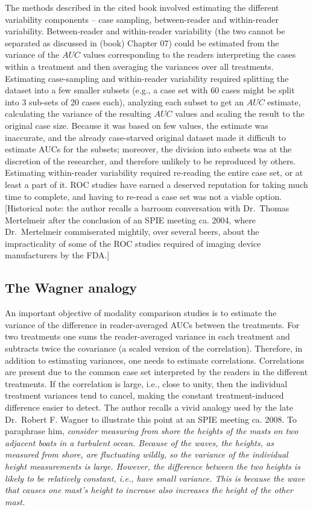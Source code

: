 \documentclass[
]{book}
\begin{document}
The methods \citep{RN412} described in the cited book involved estimating the different variability components -- case sampling, between-reader and within-reader variability. Between-reader and within-reader variability (the two cannot be separated as discussed in (book) Chapter 07) could be estimated from the variance of the \(AUC\) values corresponding to the readers interpreting the cases within a treatment and then averaging the variances over all treatments. Estimating case-sampling and within-reader variability required splitting the dataset into a few smaller subsets (e.g., a case set with 60 cases might be split into 3 sub-sets of 20 cases each), analyzing each subset to get an \(AUC\) estimate, calculating the variance of the resulting \(AUC\) values \citep{RN412} and scaling the result to the original case size. Because it was based on few values, the estimate was inaccurate, and the already case-starved original dataset made it difficult to estimate AUCs for the subsets; moreover, the division into subsets was at the discretion of the researcher, and therefore unlikely to be reproduced by others. Estimating within-reader variability required re-reading the entire case set, or at least a part of it. ROC studies have earned a deserved reputation for taking much time to complete, and having to re-read a case set was not a viable option. {[}Historical note: the author recalls a barroom conversation with Dr.~Thomas Mertelmeir after the conclusion of an SPIE meeting ca. 2004, where Dr.~Mertelmeir commiserated mightily, over several beers, about the impracticality of some of the ROC studies required of imaging device manufacturers by the FDA.{]}

\hypertarget{the-wagner-analogy}{%
\subsection{The Wagner analogy}\label{the-wagner-analogy}}

An important objective of modality comparison studies is to estimate the variance of the difference in reader-averaged AUCs between the treatments. For two treatments one sums the reader-averaged variance in each treatment and subtracts twice the covariance (a scaled version of the correlation). Therefore, in addition to estimating variances, one needs to estimate correlations. Correlations are present due to the common case set interpreted by the readers in the different treatments. If the correlation is large, i.e., close to unity, then the individual treatment variances tend to cancel, making the constant treatment-induced difference easier to detect. The author recalls a vivid analogy used by the late Dr.~Robert F. Wagner to illustrate this point at an SPIE meeting ca. 2008. To paraphrase him, \emph{consider measuring from shore the heights of the masts on two adjacent boats in a turbulent ocean. Because of the waves, the heights, as measured from shore, are fluctuating wildly, so the variance of the individual height measurements is large. However, the difference between the two heights is likely to be relatively constant, i.e., have small variance. This is because the wave that causes one mast's height to increase also increases the height of the other mast.}
\end{document}
